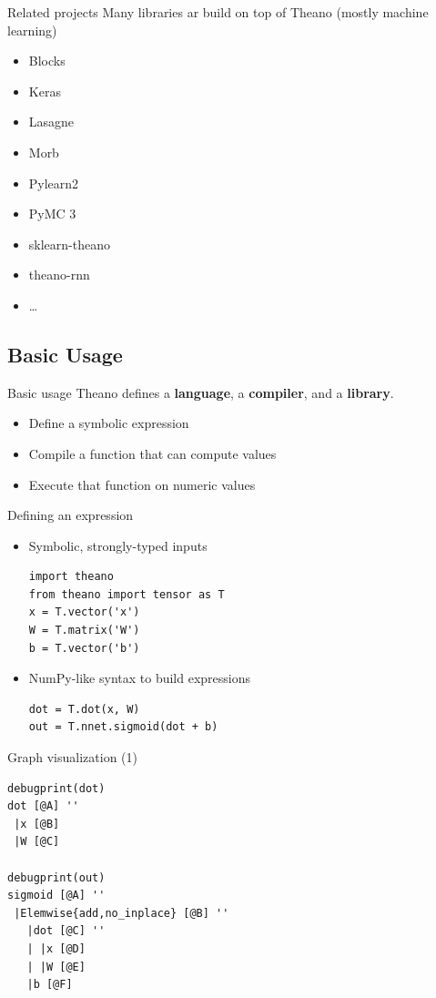 \documentclass[a4paper,9pt]{beamer}
\begin{document}
\begin{frame}{Related projects}
  Many libraries ar build on top of Theano (mostly machine learning)
  \begin{itemize}
  \item Blocks
  \item Keras
  \item Lasagne
  \item Morb
  \item Pylearn2
  \item PyMC 3
  \item sklearn-theano
  \item theano-rnn
  \item \ldots
  \end{itemize}
\end{frame}


\subsection{Basic Usage}
\begin{frame}{Basic usage}
  Theano defines a {\bf language}, a {\bf compiler}, and a {\bf library}.
  \begin{itemize}
    \item Define a symbolic expression
    \item Compile a function that can compute values
    \item Execute that function on numeric values
  \end{itemize}
\end{frame}

\begin{frame}[fragile]{Defining an expression}
  \begin{itemize}
    \item Symbolic, strongly-typed inputs
      \begin{verbatim}
import theano
from theano import tensor as T
x = T.vector('x')
W = T.matrix('W')
b = T.vector('b')
    \end{verbatim}
    \item NumPy-like syntax to build expressions
      \begin{verbatim}
dot = T.dot(x, W)
out = T.nnet.sigmoid(dot + b)
      \end{verbatim}
  \end{itemize}
\end{frame}

\begin{frame}[fragile]{Graph visualization (1)}
  \begin{verbatim}
debugprint(dot)
dot [@A] ''   
 |x [@B]
 |W [@C]

debugprint(out)
sigmoid [@A] ''   
 |Elemwise{add,no_inplace} [@B] ''   
   |dot [@C] ''   
   | |x [@D]
   | |W [@E]
   |b [@F]
  \end{verbatim}
\end{frame}
\end{document}
